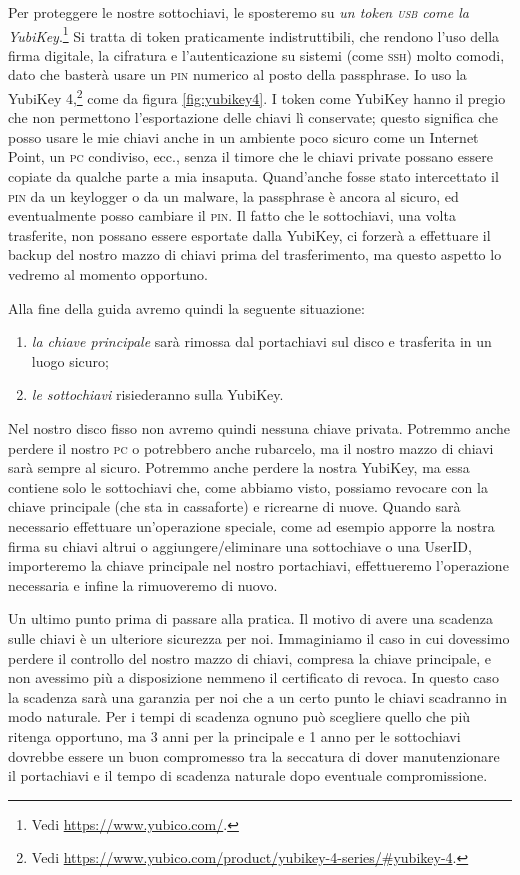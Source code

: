 Per proteggere le nostre sottochiavi, le sposteremo su \emph{un token
\textsc{usb} come la YubiKey}.\footnote{Vedi \url{https://www.yubico.com/}.} Si
tratta di token praticamente indistruttibili, che rendono l'uso della firma
digitale, la cifratura e l'autenticazione su sistemi (come \textsc{ssh}) molto
comodi, dato che basterà usare un \textsc{pin} numerico al posto della
passphrase. Io uso la YubiKey 4,\footnote{Vedi
\url{https://www.yubico.com/product/yubikey-4-series/\#yubikey-4}.} come da
figura \vref{fig:yubikey4}. I token come YubiKey hanno il pregio che non
permettono l'esportazione delle chiavi lì conservate; questo significa che posso
usare le mie chiavi anche in un ambiente poco sicuro come un Internet Point, un
\textsc{pc} condiviso, ecc., senza il timore che le chiavi private possano
essere copiate da qualche parte a mia insaputa. Quand'anche fosse stato
intercettato il \textsc{pin} da un keylogger o da un malware, la passphrase è
ancora al sicuro, ed eventualmente posso cambiare il \textsc{pin}. Il fatto che
le sottochiavi, una volta trasferite, non possano essere esportate dalla
YubiKey, ci forzerà a effettuare il backup del nostro mazzo di chiavi prima del
trasferimento, ma questo aspetto lo vedremo al momento opportuno.\bigskip

Alla fine della guida avremo quindi la seguente situazione:

\begin{enumerate}
  \item \emph{la chiave principale} sarà rimossa dal portachiavi sul disco e
  trasferita in un luogo sicuro;
  \item \emph{le sottochiavi} risiederanno sulla YubiKey.
\end{enumerate}

Nel nostro disco fisso non avremo quindi nessuna chiave privata. Potremmo anche
perdere il nostro \textsc{pc} o potrebbero anche rubarcelo, ma il nostro mazzo
di chiavi sarà sempre al sicuro. Potremmo anche perdere la nostra YubiKey, ma
essa contiene solo le sottochiavi che, come abbiamo visto, possiamo revocare con
la chiave principale (che sta in cassaforte) e ricrearne di nuove. Quando sarà
necessario effettuare un'operazione speciale, come ad esempio apporre la nostra
firma su chiavi altrui o aggiungere/eliminare una sottochiave o una UserID,
importeremo la chiave principale nel nostro portachiavi, effettueremo
l'operazione necessaria e infine la rimuoveremo di nuovo.\bigskip

Un ultimo punto prima di passare alla pratica. Il motivo di avere una
scadenza sulle chiavi è un ulteriore sicurezza per noi. Immaginiamo il caso in
cui dovessimo perdere il controllo del nostro mazzo di chiavi, compresa la
chiave principale, e non avessimo più a disposizione nemmeno il certificato di
revoca. In questo caso la scadenza sarà una garanzia per noi che a un certo
punto le chiavi scadranno in modo naturale. Per i tempi di scadenza ognuno può
scegliere quello che più ritenga opportuno, ma 3 anni per la principale e 1 anno
per le sottochiavi dovrebbe essere un buon compromesso tra la seccatura di dover
manutenzionare il portachiavi e il tempo di scadenza naturale dopo eventuale
compromissione.\bigskip

